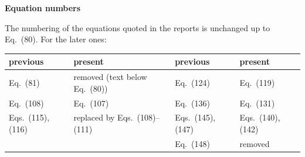 \documentclass[11pt]{article}
\begin{document}
\newpage


\noindent\textbf{\large Equation numbers}

\medskip

\noindent The numbering of the equations quoted in the reports is unchanged up to Eq.~(80). For the later ones:

\begin{center}
\small
\begin{tabular}{ll|ll}
\hline
previous & present & previous & present\\
\hline
Eq.~(81) & removed (text below Eq.~(80)) & Eq.~(124) & Eq.~(119)\\
Eq.~(108) & Eq.~(107) & Eq.~(136) & Eq.~(131)\\
Eqs.~(115), (116) & replaced by Eqs.~(108)--(111) & Eqs.~(145), (147) & Eqs.~(140), (142)\\
& & Eq.~(148) & removed\\
\hline
\end{tabular}
\end{center}
\end{document}
